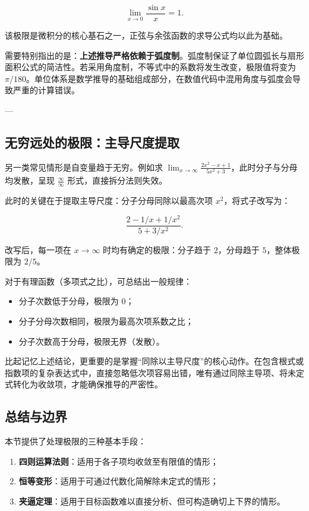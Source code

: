 \[
\lim_{x\to0}\frac{\sin x}{x}=1.
\]

该极限是微积分的核心基石之一，正弦与余弦函数的求导公式均以此为基础。

需要特别指出的是：\textbf{上述推导严格依赖于弧度制}。弧度制保证了单位圆弧长与扇形面积公式的简洁性。若采用角度制，不等式中的系数将发生改变，极限值将变为 \(\pi/180\)。单位体系是数学推导的基础组成部分，在数值代码中混用角度与弧度会导致严重的计算错误。

---

\subsection{无穷远处的极限：主导尺度提取}

另一类常见情形是自变量趋于无穷。例如求 \(\lim_{x\to\infty}\frac{2x^2-x+1}{5x^2+3}\)，此时分子与分母均发散，呈现 \(\frac{\infty}{\infty}\) 形式，直接拆分法则失效。

此时的关键在于提取主导尺度：分子分母同除以最高次项 \(x^2\)，将式子改写为：

\[
\frac{2-1/x+1/x^2}{5+3/x^2}.
\]

改写后，每一项在 \(x\to\infty\) 时均有确定的极限：分子趋于 \(2\)，分母趋于 \(5\)，整体极限为 \(2/5\)。

对于有理函数（多项式之比），可总结出一般规律：

\begin{itemize}
\tightlist
\item 分子次数低于分母，极限为 \(0\)；
\item 分子分母次数相同，极限为最高次项系数之比；
\item 分子次数高于分母，极限无界（发散）。
\end{itemize}

比起记忆上述结论，更重要的是掌握``同除以主导尺度''的核心动作。在包含根式或指数项的复杂表达式中，直接忽略低次项容易出错，唯有通过同除主导项、将未定式转化为收敛项，才能确保推导的严密性。

\subsection{总结与边界}

本节提供了处理极限的三种基本手段：

\begin{enumerate}
\tightlist
\item \textbf{四则运算法则}：适用于各子项均收敛至有限值的情形；
\item \textbf{恒等变形}：适用于可通过代数化简解除未定式的情形；
\item \textbf{夹逼定理}：适用于目标函数难以直接分析、但可构造确切上下界的情形。
\end{enumerate}

